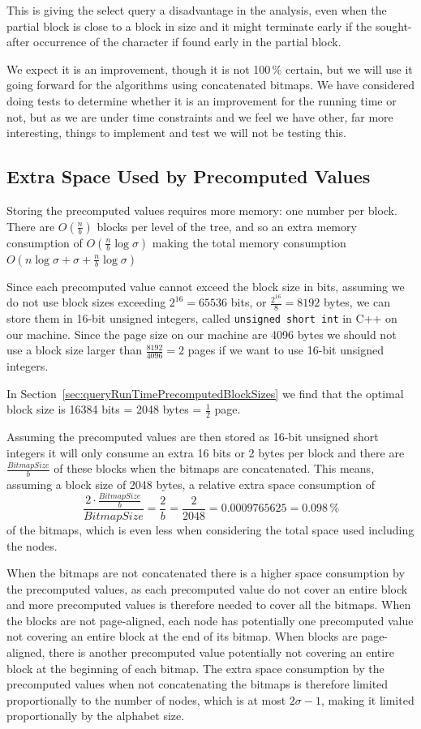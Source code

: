 This is giving the select query a disadvantage in the analysis, even when the partial block is close to a block in size and it might terminate early if the sought-after occurrence of the character if found early in the partial block.

We expect it is an improvement, though it is not 100\,\% certain, but we will use it going forward for the algorithms using concatenated bitmaps.
We have considered doing tests to determine whether it is an improvement for the running time or not, but as we are under time constraints and we feel we have other, far more interesting, things to implement and test we will not be testing this.



\subsection{Extra Space Used by Precomputed Values}
Storing the precomputed values requires more memory: one number per block.
There are $O(\frac{n}{b})$ blocks per level of the tree, and so an extra memory consumption of $O(\frac{n}{b} \log \sigma)$ making the total memory consumption $O(n \log \sigma + \sigma + \frac{n}{b} \log \sigma)$

Since each precomputed value cannot exceed the block size in bits, assuming we do not use block sizes exceeding $2^{16} = 65536$ bits, or $\frac{2^{16}}{8} = 8192$ bytes, we can store them in 16-bit unsigned integers, called \texttt{unsigned short int} in C++ on our machine.
Since the page size on our machine are 4096 bytes we should not use a block size larger than $\frac{8192}{4096} = 2$ pages if we want to use 16-bit unsigned integers.

In Section~\ref{sec:queryRunTimePrecomputedBlockSizes} we find that the optimal block size is 16384 bits = 2048 bytes = $\frac{1}{2}$ page.

Assuming the precomputed values are then stored as 16-bit unsigned short integers it will only consume an extra 16 bits or 2 bytes per block and there are $\frac{\mathit{BitmapSize}}{b}$ of these blocks when the bitmaps are concatenated.
This means, assuming a block size of 2048 bytes, a relative extra space consumption of
\[ \frac{ 2 \cdot \frac{\mathit{BitmapSize}}{b} }{\mathit{BitmapSize}} = \frac{2}{b} = \frac{2}{2048} = 0.0009765625 = 0.098\,\% \]
of the bitmaps, which is even less when considering the total space used including the nodes.

When the bitmaps are not concatenated there is a higher space consumption by the precomputed values, as each precomputed value do not cover an entire block and more precomputed values is therefore needed to cover all the bitmaps.
When the blocks are not page-aligned, each node has potentially one precomputed value not covering an entire block at the end of its bitmap.
When blocks are page-aligned, there is another precomputed value potentially not covering an entire block at the beginning of each bitmap.
The extra space consumption by the precomputed values when not concatenating the bitmaps is therefore limited proportionally to the number of nodes, which is at most $2 \sigma - 1$, making it limited proportionally by the alphabet size.

